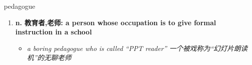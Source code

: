 
\begin{frame}
{\huge pedagogue}
\begin{center}
\begin{enumerate}\Large
  \item \textbf{n. 教育者,老师: a person whose occupation is to give formal instruction in a school}
  \begin{itemize}
    \item \em{\Large{a boring pedagogue who is called “PPT reader” 一个被戏称为“幻灯片朗读机”的无聊老师}}
  \end{itemize}
\end{enumerate}
\end{center}
\end{frame}
